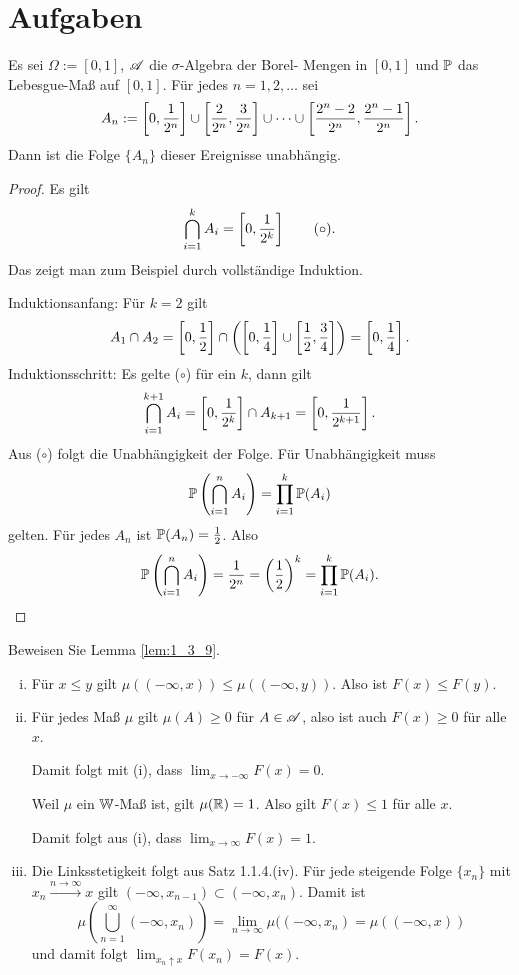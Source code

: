 \section{Aufgaben}
\begin{aufg}
  Es sei $\Omega := [0, 1]$, $\mathscr{A}$ die $\sigma$-Algebra der Borel-
  Mengen in $[0, 1]$ und $\mathbb{P}$ das Lebesgue-Maß auf $[0, 1]$. Für jedes $n = 1, 2,
  \ldots$ sei
  \[ A_n := \left[ 0, \frac{1}{2^n} \right] \cup
    \left[  \frac{2}{2^n}, \frac{3}{2^n} \right]
    \cup \cdots \cup
    \left[ \frac{2^n-2}{2^n}, \frac{2^n-1}{2^n} \right]. \]
  Dann ist die Folge $\{A_n\}$ dieser Ereignisse unabhängig.
\end{aufg}

\begin{proof}
  Es gilt
  \[ \bigcap_{i=1}^k A_i = \left[ 0,\frac{1}{2^k} \right] \tag{$\circ$}. \]
  Das zeigt man zum Beispiel durch vollständige Induktion.

  Induktionsanfang:  Für $k=2$ gilt
  \[ A_1 \cap A_2 = \left[ 0, \frac{1}{2} \right] \cap \left( \left[ 0, \frac{1}{4}
      \right] \cup \left[ \frac{1}{2}, \frac{3}{4} \right] \right) = \left[
      0,\frac{1}{4} \right]. \]
  Induktionsschritt: Es gelte ($\circ$) für ein $k$, dann gilt
  \[ \bigcap_{i=1}^{k+1} A_i = \left[ 0,\frac{1}{2^k} \right] \cap A_{k+1} =  \left[
      0,\frac{1}{2^{k+1}} \right]. \]
  Aus ($\circ$) folgt die Unabhängigkeit der Folge. Für Unabhängigkeit muss
  \[ \mathbb{P} \left( \bigcap_{i=1}^n A_i \right) = \prod_{i=1}^k \mathbb{P}(A_i) \]
  gelten. Für jedes $A_n$ ist $\mathbb{P}(A_n) = \frac{1}{2}$. Also
  \[ \mathbb{P} \left( \bigcap_{i=1}^n A_i \right) = \frac{1}{2^n} = \left( \frac{1}{2}
    \right)^k = \prod_{i=1}^k \mathbb{P}(A_i). \qedhere \]
\end{proof}

\begin{aufg}
 Beweisen Sie Lemma \ref{lem:1_3_9}.
\end{aufg}

\begin{enumerate}[(i)]
\item Für $x \le y$ gilt $\mu((-\infty,x)) \le \mu((-\infty,y))$. Also ist $F(x)
  \le F(y)$.
\item Für jedes Maß $\mu$ gilt $\mu(A) \ge 0$ für $A \in \mathscr{A}$, also ist auch
  $F(x) \ge 0$ für alle $x$.

  Damit folgt mit (i), dass $\lim_{x \to -\infty} F(x) = 0$.

  Weil $\mu$ ein $\mathbb{W}$-Maß ist, gilt $\mu(\mathbb{R}) = 1$. Also gilt $F(x) \le 1$
  für alle $x$.

  Damit folgt aus (i), dass $\lim_{x \to \infty} F(x) = 1$.
\item Die Linksstetigkeit folgt aus Satz 1.1.4.(iv). Für jede steigende Folge $\{ x_n \}$
  mit $x_n \xrightarrow{n \to \infty} x$ gilt $(-\infty, x_{n-1}) \subset
  (-\infty, x_n)$. Damit ist
  \[ \mu \left( \bigcup_{n=1}^\infty (-\infty, x_n) \right) = \lim_{n \to
      \infty} \mu( (-\infty, x_n)  = \mu( (-\infty, x) ) \]
  und damit folgt $\lim_{x_n \uparrow x} F(x_n) = F(x)$.
\end{enumerate}

